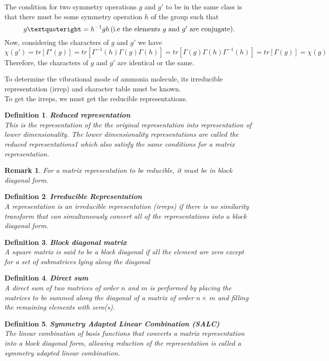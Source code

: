 \documentclass[a4paper, 12pt, openany]{report}
\newtheorem{rmk}{Remark}[section]
\newtheorem{defn}{Definition}[section]
\begin{document}
The condition for two symmetry operations $g$ and $g'$ to be in the same class is that there must be some symmetry operation $h$ of the group such that $$g’=h^{-1}gh \hspace{0.05cm}\mbox{(i.e the elements $g$ and $g'$ are  conjugate)}.$$ Now, considering 
the characters of $g$ and $g'$ we have
$$\chi(g')=tr[\Gamma'(g)]=tr[\Gamma^{-1}(h)\Gamma(g)\Gamma(h)]=tr[\Gamma(g)\Gamma(h)\Gamma^{-1}(h)]=tr[\Gamma(g)]=\chi(g)$$
Therefore, the characters of $g$ and $g'$ are identical or the same.

To determine the vibrational mode of ammonia molecule, its irreducible \linebreak representation (irrep) and character table must be known.\\ To get the irreps, we must get the reducible representations.
\begin{defn}\textbf{Reduced representation}\\
	This is the representation of the the original representation into  representation of lower dimensionality. The lower dimensionality  representations are called the reduced representations1 which also satisfy the same conditions for a matrix representation.
\end{defn}
\begin{rmk}
	For a matrix representation to be reducible, it must be in block diagonal form.
\end{rmk}
\begin{defn}\textbf{Irreducible Representation}\\
	A representation is an irreducible representation (irreps) if there is no  similarity transform that can simultaneously convert all of the  representations into a block diagonal form.
\end{defn}
\begin{defn}\textbf{Block diagonal matrix}\\
	A square matrix is said to be a block diagonal if all the element are zero except for a set of submatrices lying along the diagonal
\end{defn}
\begin{defn} \textbf{Direct sum}\\
	A direct sum of two matrices of order $n$ and $m$ is performed by placing the matrices to be summed along the diagonal of a matrix of order $n\times\,m$ and filling the remaining elements with zero(s).
\end{defn} 
\begin{defn}\textbf{Symmetry Adapted Linear Combination (SALC)}\\
	The linear combination of basis functions that converts a matrix  representation into a block diagonal form, allowing reduction of the  representation is called a symmetry adapted linear combination.
\end{defn}
\end{document}
